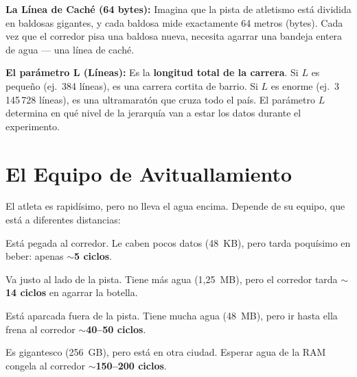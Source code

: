 \documentclass[12pt,a4paper]{article}
\begin{document}
\begin{tcolorbox}[analogia, title={Analogía: Líneas de Caché y el parámetro L}]
\textbf{La Línea de Caché (64 bytes):} Imagina que la pista de atletismo está dividida en baldosas gigantes, y cada baldosa mide exactamente 64 metros (bytes). Cada vez que el corredor pisa una baldosa nueva, necesita agarrar una bandeja entera de agua --- una línea de caché.

\vspace{6pt}
\textbf{El parámetro L (Líneas):} Es la \textbf{longitud total de la carrera}. Si $L$ es pequeño (ej.\ 384 líneas), es una carrera cortita de barrio. Si $L$ es enorme (ej.\ 3\,145\,728 líneas), es una ultramaratón que cruza todo el país. El parámetro $L$ determina en qué nivel de la jerarquía van a estar los datos durante el experimento.
\end{tcolorbox}

\section{El Equipo de Avituallamiento}
\label{sec:cache}

El atleta es rapidísimo, pero no lleva el agua encima. Depende de su equipo, que está a diferentes distancias:

\vspace{4pt}
\begin{tcolorbox}[analogia, title={Los cuatro niveles de la jerarquía}]
\begin{description}[leftmargin=1.5em, itemsep=6pt]
  \item[\color{verde}L1 --- La mochila de hidratación:] Está pegada al corredor. Le caben pocos datos (48~KB), pero tarda poquísimo en beber: apenas \textbf{$\sim$5 ciclos}.

  \item[\color{azul}L2 --- El entrenador en bicicleta:] Va justo al lado de la pista. Tiene más agua (1,25~MB), pero el corredor tarda \textbf{$\sim$14 ciclos} en agarrar la botella.

  \item[\color{naranja}L3 --- La furgoneta de apoyo:] Está aparcada fuera de la pista. Tiene mucha agua (48~MB), pero ir hasta ella frena al corredor \textbf{$\sim$40--50 ciclos}.

  \item[\color{rojo}RAM --- El almacén de la fábrica:] Es gigantesco (256~GB), pero está en otra ciudad. Esperar agua de la RAM congela al corredor \textbf{$\sim$150--200 ciclos}.
\end{description}
\end{tcolorbox}
\end{document}
